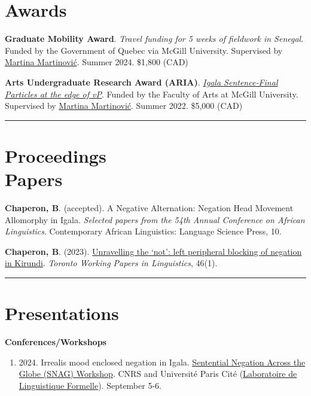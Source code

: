 \documentclass[margin,line]{resume}
\begin{document}
\begin{resume}
	\section{\mysidestyle Awards}
	
	{\textbf{Graduate Mobility Award}. \textit{Travel funding for 5 weeks of fieldwork in Senegal}. Funded by the Government of Quebec via McGill University. Supervised by \href{https://inamartinovic.com/}{Martina Martinović}. Summer 2024. \$1,800 (CAD)}
	
	{\textbf{Arts Undergraduate Research Award (ARIA)}. \href{https://www.mcgill.ca/arts-internships/files/arts-internships/brandon_chaperon.pdf}{\textit{Igala Sentence-Final Particles at the edge of \textit{v}P}}. Funded by the Faculty of Arts at McGill University. Supervised by \href{https://inamartinovic.com/}{Martina Martinović}. Summer 2022. \$5,000 (CAD)}

	\vspace{-0.5em}\rule{\textwidth}{0.4pt}


	\section{\mysidestyle Proceedings\\Papers}

	 {\textbf{Chaperon, B}. (accepted). A Negative Alternation: Negation Head Movement Allomorphy in Igala. \textit{Selected papers from the 54th Annual Conference on African Linguistics}. Contemporary African Linguistics: Language Science Press, 10.}

	 {\textbf{Chaperon, B}. (2023). \href{https://twpl.library.utoronto.ca/index.php/twpl/article/view/39257}{Unravelling the `not': left peripheral blocking of negation in Kirundi}. \textit{Toronto Working Papers in Linguistics}, 46(1).}%

	\vspace{-0.3em}\rule{\textwidth}{0.4pt}


	\section{\mysidestyle Presentations}

	\textbf{Conferences/Workshops}
	\begin{enumerate}[-, leftmargin=1em, topsep=4pt]
		
		\item[] {2024. Irrealis mood enclosed negation in Igala. \href{https://parissnag.com/conf}{Sentential Negation Across the Globe (SNAG) Workshop}. CNRS and Université Paris Cité (\href{http://www.llf.cnrs.fr/en}{Laboratoire de Linguistique Formelle}). September 5-6.}
		

\end{enumerate}
\end{resume}
\end{document}
